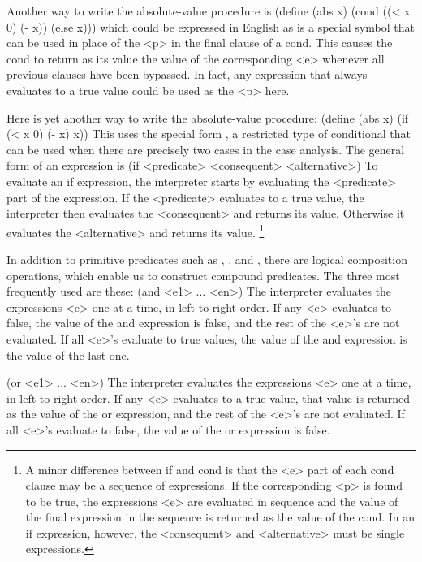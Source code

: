 Another way to write the absolute-value procedure is
\startcode
(define (abs x)
  (cond ((< x 0) (- x))
        (else x)))
\stopcode
which could be expressed in English as 
 is a special symbol that can be used in place of the <p> in the final clause of a cond.
This causes the cond to return as its value the value of the corresponding <e>
whenever all previous clauses have been bypassed.
In fact, any expression that always evaluates to a true value could be used as the <p> here.

Here is yet another way to write the absolute-value procedure:
\startcode
(define (abs x)
  (if (< x 0)
      (- x)
      x))
\stopcode
This uses the special form ,
a restricted type of conditional that can be used when there are precisely two cases in the case analysis.
The general form of an  expression is
\startcode
(if <predicate> <consequent> <alternative>)
\stopcode
To evaluate an if expression, the interpreter starts by evaluating the <predicate> part of the expression.
If the <predicate> evaluates to a true value, the interpreter then evaluates the <consequent> and returns its value.
Otherwise it evaluates the <alternative> and returns its value.
\footnote{%
   A minor difference between if and cond is that the <e> part of each cond clause may be a sequence of expressions.
   If the corresponding <p> is found to be true,
   the expressions <e> are evaluated in sequence
   and the value of the final expression in the sequence is returned as the value of the cond.
   In an if expression, however, the <consequent> and <alternative> must be single expressions.
}

In addition to primitive predicates such as \exp{<}, \exp{=}, and \exp{>},
there are logical composition operations,
which enable us to construct compound predicates.
The three most frequently used are these:
\startcode
(and <e1> ... <en>)
\stopcode
The interpreter evaluates the expressions <e> one at a time, in left-to-right order.
If any <e> evaluates to false, the value of the and expression is false,
and the rest of the <e>'s are not evaluated.
If all <e>'s evaluate to true values, the value of the and expression is the value of the last one.

\startcode
(or <e1> ... <en>)
\stopcode
The interpreter evaluates the expressions <e> one at a time, in left-to-right order.
If any <e> evaluates to a true value, that value is returned as the value of the or expression,
and the rest of the <e>'s are not evaluated.
If all <e>'s evaluate to false, the value of the or expression is false.

